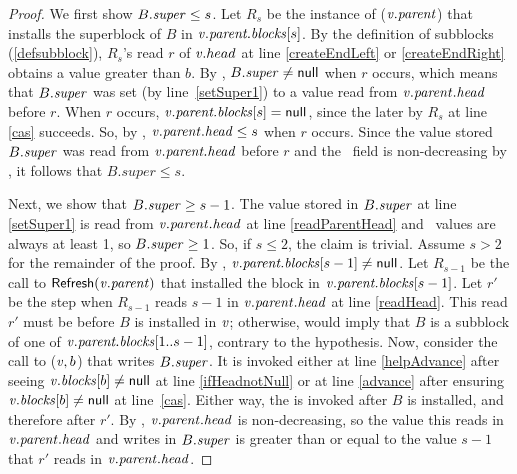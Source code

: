 \superRelationRes*
\begin{proof}
We first show $B.\mbox{\textit{super}}\leq s$.
Let $R_s$ be the instance of ($\mbox{\textnormal{\textit{v}}}.\mbox{\textit{parent}}$) that installs the superblock of $B$ 
in $\mbox{\textnormal{\textit{v}}}.\mbox{\textit{parent.blocks}}[s]$.
By the definition of subblocks (\ref{defsubblock}), $R_s$'s read $r$ of $\mbox{\textnormal{\textit{v}}}.head$ at line \ref{createEndLeft} or \ref{createEndRight} obtains a value greater than $b$.
By , $B.\mbox{\textit{super}} \neq \mbox{\sf null}$ when $r$ occurs, which means
that $B.\mbox{\textit{super}}$ was set (by line~\ref{setSuper1}) to a value read from $\mbox{\textnormal{\textit{v}}}.\mbox{\textit{parent}}.\mbox{\textit{head}}$ before $r$.
When $r$ occurs, $\mbox{\textnormal{\textit{v}}}.\mbox{\textit{parent.blocks}}[s] = \mbox{\sf null}$, since the later  by $R_s$ at line
\ref{cas} succeeds.
So, by , $\mbox{\textnormal{\textit{v}}}.\mbox{\textit{parent}}.\mbox{\textit{head}} \leq s$ when $r$ occurs.
Since the value stored $B.\mbox{\textit{super}}$ was read from $\mbox{\textnormal{\textit{v}}}.\mbox{\textit{parent.head}}$ before $r$ and the \head\ field is non-decreasing by , it follows that $B.super\leq s$.

Next, we show that $B.\mbox{\textit{super}}\geq s-1$.
The value stored in $B.\mbox{\textit{super}}$ at line \ref{setSuper1} is read from $\mbox{\textnormal{\textit{v}}}.\mbox{\textit{parent}}.\mbox{\textit{head}}$ at line \ref{readParentHead} and \head\ values are always at least 1, so $B.\mbox{\textit{super}} \geq 1$.
So, if $s\leq 2$, the claim is trivial.  Assume $s>2$ for the remainder of the proof.
By , $\mbox{\textnormal{\textit{v}}}.\mbox{\textit{parent.blocks}}[s-1]\neq \mbox{\sf null}$.  Let $R_{s-1}$ be the call to
${\sf Refresh}(\mbox{\textnormal{\textit{v}}}.\mbox{\textit{parent}})$ that installed the block in $\mbox{\textnormal{\textit{v}}}.\mbox{\textit{parent.blocks}}[s-1]$.
Let $r'$ be the step when $R_{s-1}$ reads $s-1$ in $\mbox{\textnormal{\textit{v}}}.\mbox{\textit{parent}}.\mbox{\textit{head}}$ at line \ref{readHead}.
This read $r'$ must be before $B$ is installed in $\mbox{\textnormal{\textit{v}}}$;
otherwise,  would imply that $B$ is a subblock of one of 
$\mbox{\textnormal{\textit{v}}}.\mbox{\textit{parent.blocks}}[1..s-1]$, contrary to the hypothesis.
Now, consider the call to ($\mbox{\textnormal{\textit{v}}}, b$) that writes $B.\mbox{\textit{super}}$.
It is invoked either 
at line \ref{helpAdvance} after seeing $\mbox{\textnormal{\textit{v}}}.\mbox{\textit{blocks}}[b]\neq \mbox{\sf null}$ at line \ref{ifHeadnotNull}
or at line \ref{advance} after ensuring $\mbox{\textnormal{\textit{v}}}.\mbox{\textit{blocks}}[b]\neq \mbox{\sf null}$ at line~\ref{cas}.
Either way, the  is invoked after $B$ is installed, and therefore after $r'$.
By , $\mbox{\textnormal{\textit{v}}}.\mbox{\textit{parent}}.\mbox{\textit{head}}$ is non-decreasing, so 
the value this  reads in $\mbox{\textnormal{\textit{v}}}.\mbox{\textit{parent}}.\mbox{\textit{head}}$ and
writes in $B.\mbox{\textit{super}}$ is greater than or equal to the value $s-1$ that $r'$ reads in $\mbox{\textnormal{\textit{v}}}.\mbox{\textit{parent}}.\mbox{\textit{head}}$.
\end{proof}

